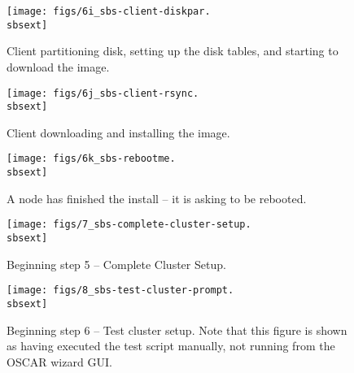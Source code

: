 \begin{figure}[htbp]
  \begin{center}
    \centerline{\texttt{[image: figs/6i\_sbs-client-diskpar.\\sbsext]}}
    \caption{Client partitioning disk, setting up the disk tables, and
      starting to download the image.}
    \label{fig:sbs-install-diskpar}
  \end{center}
\end{figure}
  

\begin{figure}[htbp]
  \begin{center}
    \centerline{\texttt{[image: figs/6j\_sbs-client-rsync.\\sbsext]}}
    \caption{Client downloading and installing the image.}
    \label{fig:sbs-install-rsync}
  \end{center}
\end{figure}

\begin{figure}[htbp]
  \begin{center}
    \centerline{\texttt{[image: figs/6k\_sbs-rebootme.\\sbsext]}}
    \caption{A node has finished the install -- it is asking to be
      rebooted.}
    \label{fig:sbs-install-finish}
  \end{center}
\end{figure}

 

\begin{figure}[htbp]
   \begin{center}
     \centerline{\texttt{[image: figs/7\_sbs-complete-cluster-setup.\\sbsext]}}
     \caption{Beginning step 5 -- Complete Cluster Setup.}
     \label{fig:sbs-install-wizard-s5}
   \end{center}
 \end{figure}



 \begin{figure}[htbp]
   \begin{center}
     \centerline{\texttt{[image: figs/8\_sbs-test-cluster-prompt.\\sbsext]}}
     \caption[Beginning step 6 -- Test cluster setup.]{Beginning step
       6 -- Test cluster setup.  Note that this figure is shown as
       having executed the test script manually, not running from the
       OSCAR wizard GUI.} 
     \label{fig:sbs-install-wizard-s6}
   \end{center}
 \end{figure}


